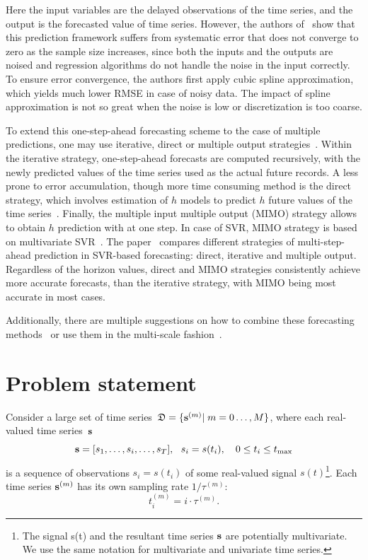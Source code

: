 \documentclass[conference]{IEEEtran}
\begin{document}
 Here the input variables are the delayed observations  of the time series, and the output is the forecasted value of time series. However, the authors of~\cite{Navarrete2015} show that this prediction framework suffers from systematic error that does not converge to zero as the sample size increases, since both the inputs and the outputs are noised and regression algorithms do not handle the noise in the input correctly. To ensure error convergence, the authors first apply cubic spline approximation, which yields much lower RMSE in case of noisy data. The impact of spline approximation is not so great when the noise is low or discretization is too coarse.

 To extend this one-step-ahead forecasting scheme to the case of multiple predictions, one may use iterative, direct or multiple output strategies~\cite{Bao2014}. Within the iterative strategy, one-step-ahead forecasts are computed recursively, with the newly predicted values of the time series used as the actual future records. A less prone to error accumulation, though more time consuming method is the direct strategy, which involves estimation of $h$ models to predict $h$ future values of the time series~\cite{Zhang2013}. Finally, the multiple input multiple output (MIMO) strategy allows to obtain $h$ prediction with at one step. In case of SVR, MIMO strategy is based on multivariate SVR~\cite{PerezCruz2002}. The paper~\cite{Bao2014} compares different strategies of multi-step-ahead prediction in SVR-based forecasting: direct, iterative and multiple output. Regardless of the horizon values, direct and MIMO strategies consistently achieve more accurate forecasts, than the iterative strategy, with MIMO being most accurate in most cases.

Additionally, there are multiple suggestions on how to combine these forecasting methods~\cite{Qiu2014, Grover2015} or use them in the multi-scale fashion~\cite{Chen2004, Zhu2012, Cui2016, Bai2015, Ferrari2012}.


\section{Problem statement}
Consider a large set of time series~${\mathfrak{D}}=\{{\mathbf{s}}^{(m)}| \; m = 0\dots, {M}\}$, where each real-valued time series~${\mathbf{s}}$
\[ {\mathbf{s}} = [s_1, \dots, s_i, \dots, s_{T}], ~~ s_i = s(t_i),\quad 0 \leq t_i \leq t_{\max}\]
is a sequence of observations $s_i = s(t_i)$ of some real-valued signal $s(t)$\footnote{The signal s(t) and the resultant time series ${\mathbf{s}}$ are potentially multivariate. We use the same notation for multivariate and univariate time series. }.
Each time series ${\mathbf{s}}^{(m)}$ has its own sampling rate $1/\tau^{(m)}$:
\[t_i^{(m)} = {i}\cdot\tau^{(m)}.\]
  
\end{document}
